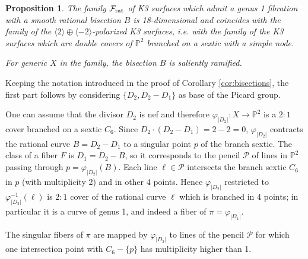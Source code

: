 \documentclass{amsart}
\newtheorem{proposition}[theorem]{Proposition}
\theoremstyle{definition}
\numberwithin{equation}{section}
\newcommand{\ra}{\rightarrow}
\begin{document}
\begin{proposition}\label{prop: F rat smooth bisection}
The family $\mathcal{F}_{\rm{rat}}$ of K3 surfaces which admit a genus 1 fibration with a smooth rational bisection $B$ is 18-dimensional and coincides with the family of the $\langle 2\rangle\oplus \langle -2\rangle$-polarized K3 surfaces, i.e. with the family of the K3 surfaces which are double covers of $\mathbb{P}^2$ branched on a sextic with a simple node.

For generic $X$ in the family, the bisection $B$ is saliently ramified.

\end{proposition}
 
\proof
Keeping the notation introduced in the proof of Corollary \ref{cor:bisections}, the first part follows by considering $\{D_2, D_2-D_1\}$ as base of the Picard group.

One can assume that the divisor $D_2$ is nef and therefore $\varphi_{|D_2|}:X\ra \mathbb{P}^2$ is a $2:1$ cover branched on a sextic $C_6$. Since $D_2\cdot (D_2-D_1)=2-2=0$, $\varphi_{|D_2|}$ contracts the rational curve $B=D_2-D_1$ to a singular point $p$ of the branch sextic.
The class of a fiber $F$ is $D_1=D_2-B$, so it corresponds to the pencil $\mathcal{P}$ of lines in $\mathbb{P}^2$ passing through $p=\varphi_{|D_2|}(B)$. Each line $\ell\in \mathcal{P}$ intersects the branch sextic $C_6$ in $p$ (with multiplicity 2) and in other 4 points. Hence $\varphi_{|D_2|}$ restricted to $\varphi_{|D_2|}^{-1}(\ell)$ is $2:1$ cover of the rational curve  $\ell$ which is branched in 4 points; in particular it is a curve of genus 1, and indeed a fiber of $\pi=\varphi_{|D_1|}$.

The singular fibers of $\pi$ are mapped by $\varphi_{|D_2|}$ to lines of the pencil $\mathcal{P}$ for which one intersection point with $C_6-\{p\}$ has multiplicity higher than 1. 
\end{document}
